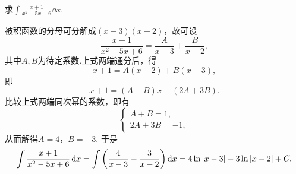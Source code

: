 \begin{example}
求\(\int \frac{x+1}{x^2-5x+6} \dd{x}\).
\begin{solution}
被积函数的分母可分解成\((x-3)(x-2)\)，故可设\begin{equation*}
	\frac{x+1}{x^2-5x+6}
	= \frac{A}{x-3} + \frac{B}{x-2},
\end{equation*}
其中\(A,B\)为待定系数.上式两端通分后，得\begin{equation*}
	x+1 = A(x-2)+B(x-3),
\end{equation*}
即\begin{equation*}
	x+1 = (A+B)x -(2A+3B).
\end{equation*}
比较上式两端同次幂的系数，即有\begin{equation*}
	\left\{ \begin{array}{l}
		A+B = 1, \\
		2A+3B = -1,
	\end{array} \right.
\end{equation*}
从而解得\(A=4\)，\(B=-3\).
于是\begin{equation*}
	\int \frac{x+1}{x^2-5x+6} \dd{x}
	= \int \left(\frac{4}{x-3} - \frac{3}{x-2}\right) \dd{x}
	= 4\ln\abs{x-3} - 3\ln\abs{x-2} + C.
\end{equation*}
\end{solution}
\end{example}

